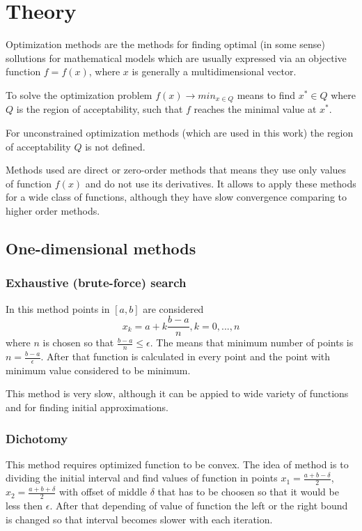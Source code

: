 \section*{Theory}

Optimization methods are the methods for finding optimal (in some sense) sollutions
for mathematical models which are usually expressed via an objective function $f = f(x)$, where $x$ is generally a multidimensional vector.

To solve the optimization problem $f(x) \rightarrow min_{x\in Q}$ means to find $x^{*} \in Q$ where $Q$ is the region of acceptability, such  that $f$ reaches the minimal value at $x^{*}$.

For unconstrained optimization methods (which are used in this work) the region of acceptability $Q$ is not defined.

Methods used are direct or zero-order methods that means they use only values of function $f(x)$ and do not use its derivatives. It allows to apply these methods for a wide class of functions, although they have slow convergence comparing to higher order methods. 
\subsection*{One-dimensional methods}
\subsubsection*{Exhaustive (brute-force) search}

In this method points in $[a, b]$ are considered
\begin{equation*}
    x_k = a + k\frac{b - a}{n}, k = 0, ..., n
\end{equation*}
where $n$ is chosen so that $\frac{b - a}{n} \leq \epsilon$.
The means that minimum number of points is $n = \frac{b - a}{\epsilon}$.
After that function is calculated in every point and the point with minimum value considered to be minimum.

This method is very slow, although it can be appied to wide variety of functions and for finding initial approximations.

\subsubsection*{Dichotomy}

This method requires optimized function to be convex. The idea of method is to dividing the initial interval and find values
of function in points $x_1 = \frac{a + b - \delta}{2}$, $x_2 = \frac{a + b + \delta}{2}$ with offset of middle $\delta$ that has to be choosen so that it would be less then $\epsilon$.
After that depending of value of function the left or the right bound is changed so that interval becomes slower with each iteration.
